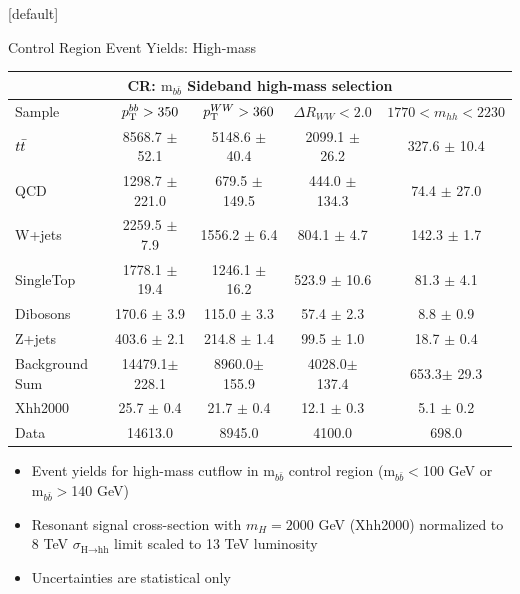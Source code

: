 \documentclass{beamer}
\newcommand*{\ttbar}{\ensuremath{\lowercase{t\bar{t}}}\xspace}
\newcommand*{\mbb}{\ensuremath{\text{m}_{b\bar{b}}}\xspace}
\begin{document}
{  \makeatletter %
  [default]
  \def\beamer@entrycode{\vspace*{-1.075\headheight}}
  \begin{frame}{Control Region Event Yields: High-mass}
    \begin{table}
      \begin{adjustbox}{width=1\textwidth}
        \begin{tabular}{l|c|c|c|c}
          \hline\hline
          \multicolumn{5}{c}{\textbf{CR}: \mbb Sideband high-mass selection}\\\hline\hline
          Sample  	& $p_{\rm T}^{bb}>350$  	& $p_{\rm T}^{WW}>360$  	& $\Delta R_{WW} <2.0$ 	& $1770 < m_{hh} < 2230$ 	 \\\hline
          \ttbar 	& 8568.7 $\pm$ 52.1 	& 5148.6 $\pm$ 40.4 	& 2099.1 $\pm$ 26.2 	& 327.6 $\pm$ 10.4 	\\\hline 
          QCD 	& 1298.7 $\pm$ 221.0 	& 679.5 $\pm$ 149.5 	& 444.0 $\pm$ 134.3 	& 74.4 $\pm$ 27.0 	\\\hline 
          W+jets 	& 2259.5 $\pm$ 7.9 	& 1556.2 $\pm$ 6.4 	& 804.1 $\pm$ 4.7 	& 142.3 $\pm$ 1.7 	\\\hline 
          SingleTop 	& 1778.1 $\pm$ 19.4 	& 1246.1 $\pm$ 16.2 	& 523.9 $\pm$ 10.6 	& 81.3 $\pm$ 4.1 	\\\hline 
          Dibosons 	& 170.6 $\pm$ 3.9 	& 115.0 $\pm$ 3.3 	& 57.4 $\pm$ 2.3 	& 8.8 $\pm$ 0.9 	\\\hline 
          Z+jets 	& 403.6 $\pm$ 2.1 	& 214.8 $\pm$ 1.4 	& 99.5 $\pm$ 1.0 	& 18.7 $\pm$ 0.4 	\\\hline 
          \hline
          Background Sum 	& 14479.1$\pm$ 228.1 	& 8960.0$\pm$ 155.9 	& 4028.0$\pm$ 137.4 	& 653.3$\pm$ 29.3	\\\hline 
          \hline
          Xhh2000 	& 25.7 $\pm$ 0.4 	& 21.7 $\pm$ 0.4 	& 12.1 $\pm$ 0.3 	& 5.1 $\pm$ 0.2 	\\\hline 
          Data 	& 14613.0 	& 8945.0 	& 4100.0 	& 698.0 	\\\hline 
          \hline
        \end{tabular}
      \end{adjustbox}
    \end{table}
    \begin{itemize}
    \item Event yields for high-mass cutflow in \mbb control region (\mbb$<$100 GeV or \mbb$>$140 GeV)
    \item Resonant signal cross-section with $m_H=2000$ GeV (Xhh2000) normalized to 8 TeV  $\sigma_{\text{H}\to \text{hh}}$ limit scaled to 13 TeV luminosity
    \item Uncertainties are statistical only
    \end{itemize}
  \end{frame}

}
\end{document}
